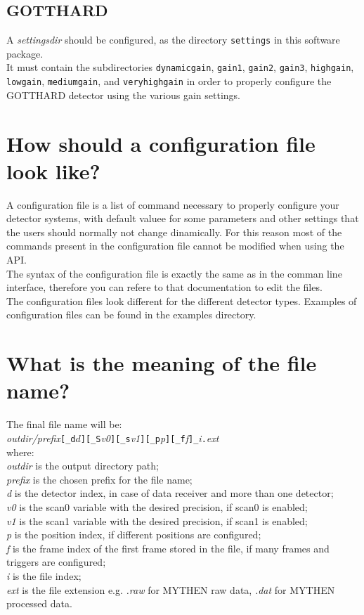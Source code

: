 \subsection{GOTTHARD}
A \textit{settingsdir} should be configured, as the directory  \verb=settings= in this software package.\\
It must contain the subdirectories \verb=dynamicgain=, \verb=gain1=,  \verb=gain2=,  \verb=gain3=,  \verb=highgain=,  \verb=lowgain=,  \verb=mediumgain=, and   \verb=veryhighgain= in order to properly configure the GOTTHARD detector using the various gain settings.


\section{How should a configuration file look like?}

A configuration file is a list of command necessary to properly configure your detector systems, with default valuee for some parameters and other settings that the users should normally not change dinamically.
For this reason most of the commands present in the configuration file cannot be modified when using the API.\\
The syntax of the configuration file is exactly the same as in the comman line interface, therefore you can refere to that documentation to edit the files.\\
The configuration files look different for the different detector types. Examples of configuration files can be found in the examples directory.

\section{What is the meaning of the file name?}
The final file name will be: \\
\textit{outdir/prefix}\verb=[_d=$d$\verb=][_S=\textit{v0}\verb=][_s=\textit{v1}\verb=][_p=\textit{p}\verb=][_f=\textit{f}\verb=]_=\textit{i}\verb=.=\textit{ext}\\
where: \\
\textit{outdir} is the output directory path;\\
\textit{prefix} is the chosen prefix for the file name;\\
\textit{d} is the detector index, in case of data receiver and more than one detector;\\
\textit{v0} is the scan0 variable with the desired precision, if scan0 is enabled;\\
\textit{v1} is the scan1 variable with the desired precision, if scan1 is enabled;\\
\textit{p} is the position index, if different positions are configured;\\
\textit{f} is the frame index of the first frame stored in the file, if many frames and triggers are configured;\\
\textit{i} is the file index;\\
\textit{ext} is the file extension e.g. \textit{.raw} for MYTHEN raw data, \textit{.dat} for MYTHEN processed data.

